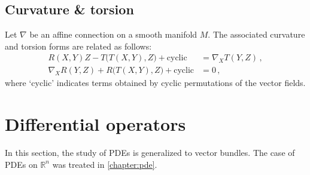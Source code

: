 \subsection{Curvature \& torsion}


    \begin{property}\label{bundle:bianchi_identities}
        Let $\nabla$ be an affine connection on a smooth manifold $M$. The associated curvature and torsion forms are related as follows:
        \begin{align}
            R(X,Y)Z-T\bigl(T(X,Y),Z\bigr)+\text{cyclic} &= \nabla_XT(Y,Z)\,,\\
            \nabla_XR(Y,Z)+R\bigl(T(X,Y),Z\bigr)+\text{cyclic} &= 0\,,
        \end{align}
        where `cyclic' indicates terms obtained by cyclic permutations of the vector fields.
    \end{property}




\section{Differential operators}

    In this section, the study of PDEs is generalized to vector bundles. The case of PDEs on $\mathbb{R}^n$ was treated in \cref{chapter:pde}.

